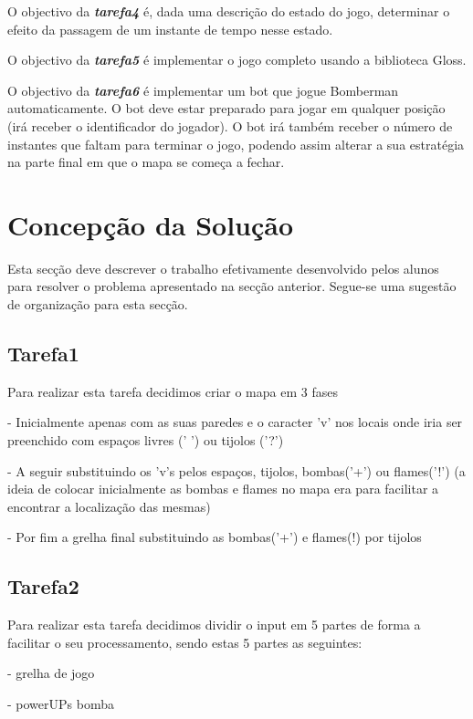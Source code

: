 \documentclass[a4paper]{article}
\begin{document}
O objectivo da \textbf{\emph{tarefa4}} é, dada uma descrição do estado do jogo, determinar o efeito da
passagem de um instante de tempo nesse estado.

O objectivo da \textbf{\emph{tarefa5}} é implementar o jogo completo usando a biblioteca Gloss.

O objectivo da \textbf{\emph{tarefa6}} é implementar um bot que jogue Bomberman automaticamente.
O bot deve estar preparado para jogar em qualquer posição (irá receber o identificador do
jogador). O bot irá também receber o número de instantes que faltam para terminar o jogo, podendo
assim alterar a sua estratégia na parte final em que o mapa se começa a fechar.


\pagebreak
\section{Concepção da Solução}
\label{sec:solucao}

Esta secção deve descrever o trabalho efetivamente desenvolvido pelos
alunos para resolver o problema apresentado na secção
anterior. Segue-se uma sugestão de organização para esta secção.

\subsection{Tarefa1}

Para realizar esta tarefa decidimos criar o mapa em 3 fases

 - Inicialmente apenas com as suas paredes e o caracter 'v' nos locais onde iria ser preenchido com espaços livres (' ') ou tijolos ('?')

 - A seguir substituindo os 'v's pelos espaços, tijolos, bombas('+') ou flames('!') (a ideia de colocar inicialmente as bombas e flames no mapa era para facilitar a encontrar a localização das mesmas)

 - Por fim a grelha final substituindo as bombas('+') e flames(!) por tijolos


\subsection{Tarefa2}

Para realizar esta tarefa decidimos dividir o input em 5 partes de forma a facilitar o seu processamento,
sendo estas 5 partes as seguintes:

- grelha de jogo

- powerUPs bomba
\end{document}
